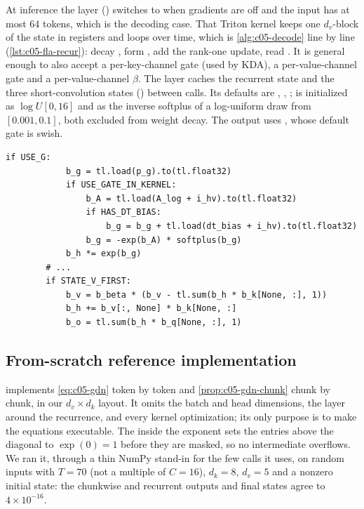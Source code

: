 \begin{implnote}[title={In the code: decoding and the layer (\texttt{fused\_recurrent.py}, \texttt{layers/gated\_deltanet.py})}]
At inference the \fla{} layer  ()
switches to  when gradients are off and the input has at
most 64 tokens, which is the decoding case. That Triton kernel keeps one $d_v$-block of the state in
registers and loops over time, which is \cref{alg:c05-decode} line by line
(\cref{lst:c05-fla-recur}): decay , form
, add the rank-one update, read . It is general enough to
also accept a per-key-channel gate  (used by KDA), a per-value-channel gate  and
a per-value-channel $\beta$. The layer caches the recurrent state and the three short-convolution
states () between calls. Its defaults are ,
, ;  is initialized as $\log U[0,16]$ and
 as the inverse softplus of a log-uniform draw from $[0.001, 0.1]$, both excluded
from weight decay. The output uses , whose default gate is swish.
\end{implnote}

\begin{lstlisting}[caption={Excerpt from \texttt{repos/\allowbreak{}fla-org\_\_flash-linear-attention/\allowbreak{}fla/\allowbreak{}ops/\allowbreak{}gated\_delta\_rule/\allowbreak{}fused\_recurrent.py} (time loop of the decoding kernel)},label={lst:c05-fla-recur}]
        if USE_G:
            b_g = tl.load(p_g).to(tl.float32)
            if USE_GATE_IN_KERNEL:
                b_A = tl.load(A_log + i_hv).to(tl.float32)
                if HAS_DT_BIAS:
                    b_g = b_g + tl.load(dt_bias + i_hv).to(tl.float32)
                b_g = -exp(b_A) * softplus(b_g)
            b_h *= exp(b_g)
        # ...
        if STATE_V_FIRST:
            b_v = b_beta * (b_v - tl.sum(b_h * b_k[None, :], 1))
            b_h += b_v[:, None] * b_k[None, :]
            b_o = tl.sum(b_h * b_q[None, :], 1)
\end{lstlisting}

\subsection{From-scratch reference implementation}

 implements \cref{eq:c05-gdn} token by token and
\cref{prop:c05-gdn-chunk} chunk by chunk, in our $d_v\times d_k$ layout. It omits the batch and
head dimensions, the layer around the recurrence, and every kernel optimization; its only purpose
is to make the equations executable. The  inside the exponent sets the
entries above the diagonal to $\exp(0) = 1$ before they are masked, so no intermediate overflows.
We ran it, through a thin NumPy stand-in for the few  calls it uses, on random inputs
with $T = 70$ (not a multiple of $C = 16$), $d_k = 8$, $d_v = 5$ and a nonzero initial state:
the chunkwise and recurrent outputs and final states agree to $4\times10^{-16}$.

